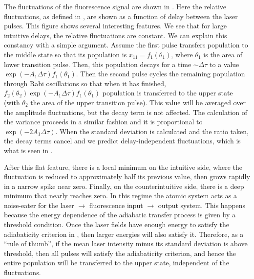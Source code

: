 \begin{figure}[tbp]
\bigskip
{}
\end{figure}

The fluctuations of the fluorescence signal are shown in .  Here the
relative fluctuations, as defined in , are shown as a
function of delay between the laser pulses.  This figure shows several
interesting features.  We see that for large intuitive delays, the relative
fluctuations are constant.  We can explain this constancy with a simple
argument.  Assume the first pulse transfers population to the middle state so
that its population is $x_{11} = f_1(\theta_1)$, where $\theta_1$ is the
area of lower transition pulse.  Then, this population decays for a time $\sim
\Delta \tau$ to a value $\exp(-A_1 \Delta \tau) f_1(\theta_1)$. Then the
second pulse cycles the remaining population through Rabi oscillations so that
when it has finished, $f_2(\theta_2) \exp(-A_1 \Delta \tau) f_1(\theta_1)$
population is transferred to the upper state (with $\theta_2$ the area of
the upper transition pulse).  This value will be averaged over the amplitude
fluctuations, but the decay term is not affected.  The calculation
of the variance proceeds in a similar fashion and it is proportional to
$\exp(- 2 A_1 \Delta \tau)$.  When the standard deviation is calculated and
the ratio taken, the decay terms cancel and we predict delay-independent
fluctuations, which is what is seen in .

After this flat feature, there is a local minimum on the intuitive side, where
the fluctuation is reduced to approximately half its previous value, then grows
rapidly in a narrow spike near zero.  Finally, on the counterintuitive side,
there is a deep minimum that nearly reaches zero.  In this regime the atomic
system acts as a noise-eater for the laser $\rightarrow$ fluorescence
input $\rightarrow$ output system.  This happens because the energy dependence
of the adiabatic transfer process is given by a threshold condition.  Once the
laser fields have enough energy to satisfy the adiabaticity criterion in
, then larger energies will also satisfy it. 
Therefore, as a ``rule of thumb'', if the mean laser intensity minus its
standard deviation is above threshold, then all pulses will satisfy the
adiabaticity criterion, and hence the entire population will be transferred to
the upper state, independent of the fluctuations.

